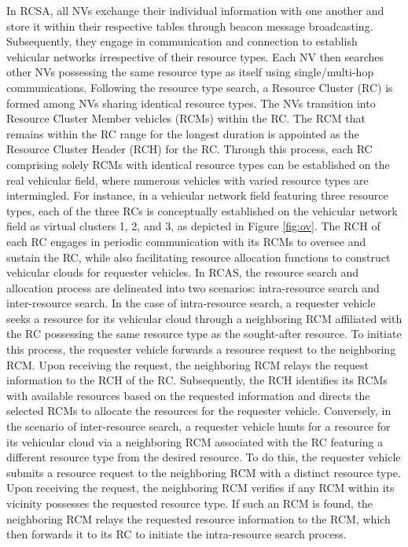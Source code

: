 \documentclass[sensors,article,accept,moreauthors,pdftex]{Definitions/mdpi}
\begin{document}
In RCSA, all NVs exchange their individual information with one another and store it within their respective tables through beacon message broadcasting. Subsequently, they engage in communication and connection to establish vehicular networks irrespective of their resource types. Each NV then searches other NVs possessing the same resource type as itself using single/multi-hop communications. Following the resource type search, a Resource Cluster (RC) is formed among NVs sharing identical resource types. The NVs transition into Resource Cluster Member vehicles (RCMs) within the RC. The RCM that remains within the RC range for the longest duration is appointed as the Resource Cluster Header (RCH) for the RC. Through this process, each RC comprising solely RCMs with identical resource types can be established on the real vehicular field, where numerous vehicles with varied resource types are intermingled.
For instance, in a vehicular network field featuring three resource types, each of the three RCs is conceptually established on the vehicular network field as virtual clusters 1, 2, and 3, as depicted in Figure \ref{fig:ov}. The RCH of each RC engages in periodic communication with its RCMs to oversee and sustain the RC, while also facilitating resource allocation functions to construct vehicular clouds for requester vehicles.
In RCAS, the resource search and allocation process are delineated into two scenarios: intra-resource search and inter-resource search.
In the case of intra-resource search, a requester vehicle seeks a resource for its vehicular cloud through a neighboring RCM affiliated with the RC possessing the same resource type as the sought-after resource. To initiate this process, the requester vehicle forwards a resource request to the neighboring RCM. Upon receiving the request, the neighboring RCM relays the request information to the RCH of the RC. Subsequently, the RCH identifies its RCMs with available resources based on the requested information and directs the selected RCMs to allocate the resources for the requester vehicle.
Conversely, in the scenario of inter-resource search, a requester vehicle hunts for a resource for its vehicular cloud via a neighboring RCM associated with the RC featuring a different resource type from the desired resource. To do this, the requester vehicle submits a resource request to the neighboring RCM with a distinct resource type.
Upon receiving the request, the neighboring RCM verifies if any RCM within its vicinity possesses the requested resource type. If such an RCM is found, the neighboring RCM relays the requested resource information to the RCM, which then forwards it to its RC to initiate the intra-resource search process.
\end{document}
